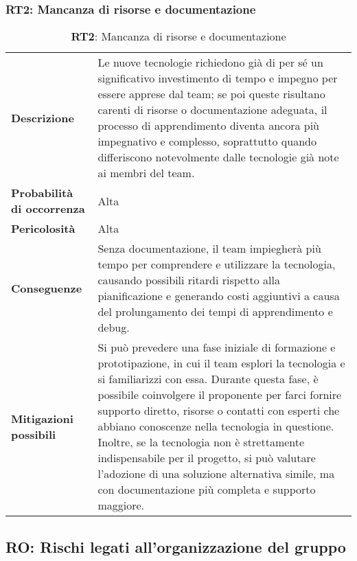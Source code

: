 \subsubsection{RT2: Mancanza di risorse e documentazione}
\label{sec:Mancanza di risorse e documentazione}
\begin{table}[h!]
    \centering
    \renewcommand{\arraystretch}{1.5} %
    \begin{tabularx}{\textwidth}{|X|X|}\hline
    \rowcolor[HTML]{FFD700} 
    \multicolumn{2}{|c|}{\textbf{Mancanza di risorse e documentazione}} \\ \hline
    \textbf{Descrizione} & Le nuove tecnologie richiedono già di per sé un significativo investimento di tempo e impegno per essere apprese dal team; 
    se poi queste risultano carenti di risorse o documentazione adeguata, 
    il processo di apprendimento diventa ancora più impegnativo e complesso, soprattutto quando differiscono notevolmente dalle tecnologie già note ai membri del team.\\ \hline
    \textbf{Probabilità di occorrenza} & Alta \\ \hline
    \textbf{Pericolosità} & Alta \\ \hline
    \textbf{Conseguenze} & Senza documentazione, il team impiegherà più tempo per comprendere e utilizzare la tecnologia, 
    causando possibili ritardi rispetto alla pianificazione e generando costi aggiuntivi a causa del prolungamento dei tempi di apprendimento e debug. \\ \hline
    \textbf{Mitigazioni possibili} & Si può prevedere una fase iniziale di formazione e prototipazione, in cui il team esplori la tecnologia e si familiarizzi con essa.
    Durante questa fase, è possibile coinvolgere il proponente per farci fornire supporto diretto, risorse o contatti con esperti che abbiano conoscenze nella tecnologia in questione.
    Inoltre, se la tecnologia non è strettamente indispensabile per il progetto, si può valutare l’adozione di una soluzione alternativa simile, 
    ma con documentazione più completa e supporto maggiore. \\ \hline
    \end{tabularx}
    \caption{\textbf{RT2}: Mancanza di risorse e documentazione}
    \end{table}

\newpage

\subsection{RO: Rischi legati all'organizzazione del gruppo}

